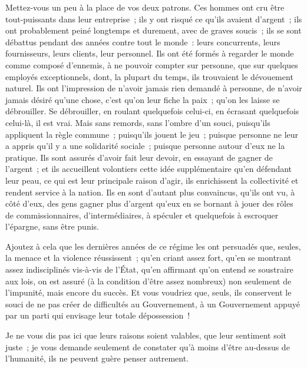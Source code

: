 \documentclass[french,twoside]{book} %
\begin{document}
Mettez-vous un peu à la place de vos deux patrons. Ces hommes ont cru être tout-puissants dans leur entreprise ; ils y ont risqué ce qu'ils avaient d'argent ; ils ont probablement peiné longtemps et durement, avec de graves soucis ; ils se sont débattus pendant des années contre tout le monde : leurs concurrents, leurs fournisseurs, leurs clients, leur personnel. Ils ont été formés à regarder le monde comme composé d'ennemis, à ne pouvoir compter sur personne, que sur quelques employés exceptionnels, dont, la plupart du temps, ils trouvaient le dévouement naturel. Ils ont l'impression de n'avoir jamais rien demandé à personne, de n'avoir jamais désiré qu'une chose, c'est qu'on leur fiche la paix ; qu'on les laisse se débrouiller. Se débrouiller, en roulant quelquefois celui-ci, en écrasant quelquefois celui-là, il est vrai. Mais sans remords, sans l'ombre d'un souci, puisqu'ils appliquent la règle commune ; puisqu'ils jouent le jeu ; puisque personne ne leur a appris qu'il y a une solidarité sociale ; puisque personne autour d'eux ne la pratique. Ils sont assurés d'avoir fait leur devoir, en essayant de gagner de l'argent ; et ils accueillent volontiers cette idée supplémentaire qu'en défendant leur peau, ce qui est leur principale raison d'agir, ils enrichissent la collectivité et rendent service à la nation. Ils en sont d'autant plus convaincus, qu'ils ont vu, à côté d'eux, des gens gagner plus d'argent qu'eux en se bornant à jouer des rôles de commissionnaires, d'intermédiaires, à spéculer et quelquefois à escroquer l'épargne, sans être punis.\par
Ajoutez à cela que les dernières années de ce régime les ont persuadés que, seules, la menace et la violence réussissent ; qu'en criant assez fort, qu'en se montrant assez indisciplinés vis-à-vis de l'État, qu'en affirmant qu'on entend se soustraire aux lois, on est assuré (à la condition d'être assez nombreux) non seulement de l'impunité, mais encore du succès. Et vous voudriez que, seuls, ils conservent le souci de ne pas créer de difficultés au Gouvernement, à un Gouvernement appuyé par un parti qui envisage leur totale dépossession !\par
Je ne vous dis pas ici que leurs raisons soient valables, que leur sentiment soit juste ; je vous demande seulement de constater qu'à moins d'être au-dessus de l’humanité, ils ne peuvent guère penser autrement.\par
\end{document}
